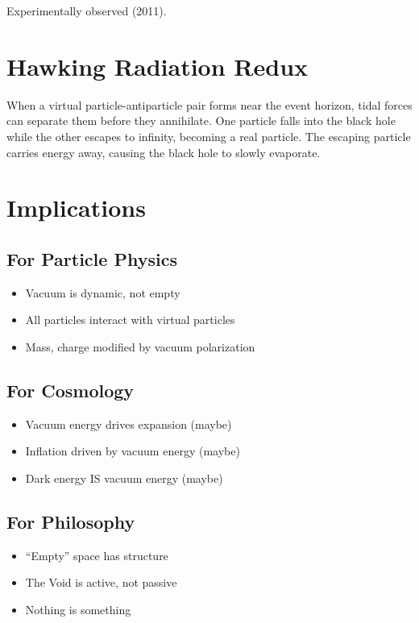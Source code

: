 \documentclass[
  11pt,
  letterpaper,
  twoside,
  openright]{book}
\providecommand{\tightlist}{%
  \setlength{\itemsep}{0pt}\setlength{\parskip}{0pt}}
\begin{document}
Experimentally observed (2011).

\section{Hawking Radiation Redux}\label{hawking-radiation-redux}

When a virtual particle-antiparticle pair forms near the event horizon,
tidal forces can separate them before they annihilate. One particle
falls into the black hole while the other escapes to infinity, becoming
a real particle. The escaping particle carries energy away, causing the
black hole to slowly evaporate.

\section{Implications}\label{implications-2}

\subsection{For Particle Physics}\label{for-particle-physics}

\begin{itemize}
\tightlist
\item
  Vacuum is dynamic, not empty
\item
  All particles interact with virtual particles
\item
  Mass, charge modified by vacuum polarization
\end{itemize}

\subsection{For Cosmology}\label{for-cosmology}

\begin{itemize}
\tightlist
\item
  Vacuum energy drives expansion (maybe)
\item
  Inflation driven by vacuum energy (maybe)
\item
  Dark energy IS vacuum energy (maybe)
\end{itemize}

\subsection{For Philosophy}\label{for-philosophy}

\begin{itemize}
\tightlist
\item
  ``Empty'' space has structure
\item
  The Void is active, not passive
\item
  Nothing is something
\end{itemize}
\end{document}
